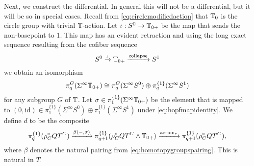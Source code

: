 Next, we construct the differential. 
 In general
 this will not be a differential, but it will be so in special cases.
 Recall from \eqref{eq:circlemodifiedaction} that $\mathbb{T}_0$ is the
 circle group with trivial $\mathbb{T}$-action.
 Let $\iota: S^0\to \mathbb{T}_{0+}$ be the map that sends the non-basepoint
 to $1$. This map has an evident retraction and using
 the long exact sequence resulting from the cofiber sequence
 \[
 S^0\xrightarrow{\iota}\mathbb{T}_{0+}\xrightarrow{\mathrm{collapse}} S^1
 \]
we obtain an isomorphism
\begin{equation}\label{eq:hopfmapidentity}
\pi_q^{G}(\Sigma^\infty \mathbb{T}_{0+})\cong \pi_q^{G}(\Sigma^\infty S^0)
\oplus \pi_q^{\{1\}}(\Sigma^\infty S^1)
\end{equation}
for any subgroup $G$ of $\mathbb{T}$.
%
Let $\sigma\in \pi_1^{\{1\}}(\Sigma^\infty \mathbb{T}_{0+})$ be the element
that is mapped to $(0,\mathrm{id})\in 
\pi_1^{\{1\}}(\Sigma^\infty S^0)
\oplus \pi_1^{\{1\}}(\Sigma^\infty S^1)
$ under \eqref{eq:hopfmapidentity}. We define $d$ to be the composite
\begin{equation}\label{eq:differential}
\pi_q^{\{1\}}(\rho^\ast_C QT^C)\xrightarrow{\beta(-,\sigma)} \pi_{q+1}^{\{1\}}(\rho^\ast_C QT^C\wedge \mathbb{T}_{0+})
\xrightarrow{\mathrm{action}_\ast} \pi_{q+1}^{\{1\}}(\rho^\ast_C QT^C),
\end{equation}
where $\beta$ denotes the natural pairing from \eqref{eq:homotopygroupspairing}.
This is natural in $T$. 

